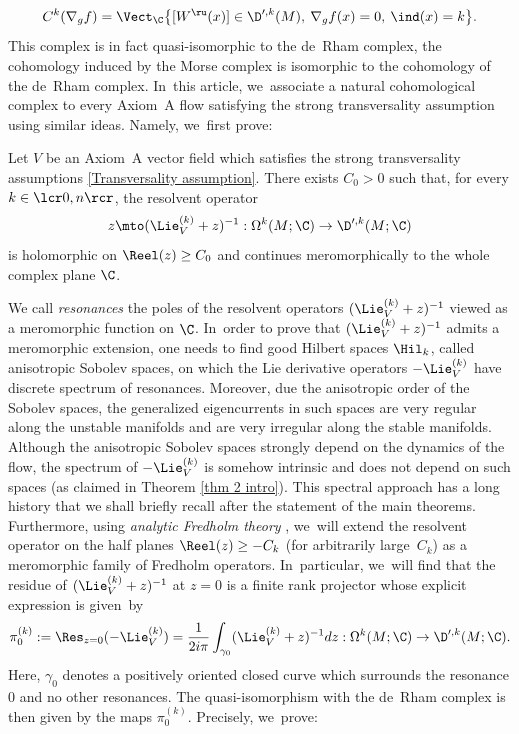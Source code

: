 \begin{equation}{\label{eq: intro Morse complex current Laudenbach}}
C^k (\nabla_g f) = \Vect_{\C} \bigl\{ [W^\ru (x)] \in \D'^{,k} (M), \: \nabla_g f(x) = 0,\: \ind (x) = k \bigr\}.
\end{equation}
This complex is in fact quasi-isomorphic to the de~Rham complex, \ie the cohomology induced by the Morse complex is isomorphic to the cohomology of the de~Rham complex. In~this article, we~associate a natural cohomological complex to every Axiom~A flow satisfying the strong transversality assumption using similar ideas. Namely, we~first prove:

\begin{thm}\label{thm 2 intro}
Let $V$ be an Axiom~A vector field which satisfies the strong transversality assumptions \eqref{Transversality assumption}. There exists $C_0 > 0$ such that, for every $k\in\lcr0,n\rcr$, the resolvent operator
\[
z \mto(\Lie_V^{(k)} + z)^{-1}: \Omega^k (M;\C) \to \D'^{, k}(M;\C)
\]
is holomorphic on $\Reel (z)\geq C_0$ and continues meromorphically to the whole complex plane $\C$.
\end{thm}

We call \textit{resonances} the poles of the resolvent operators $(\Lie_V^{(k)} + z)^{-1}$ viewed as a meromorphic function on $\C$. In~order to prove that $(\Lie_V^{(k)} + z)^{-1}$ admits a meromorphic extension, one needs to find good Hilbert spaces $\Hil_k$, called anisotropic Sobolev spaces, on which the Lie derivative operators $-\Lie_V^{(k)}$ have discrete spectrum of resonances. Moreover, due the anisotropic order of the Sobolev spaces, the generalized eigencurrents in such spaces are very regular along the unstable manifolds and are very irregular along the stable manifolds. Although the anisotropic Sobolev spaces strongly depend on the dynamics of the flow, the spectrum of $-\Lie_V^{(k)}$ is somehow intrinsic and does not depend on such spaces (as claimed in Theorem \ref{thm 2 intro}). This spectral approach has a long history that we shall briefly recall after the statement of the main theorems. Furthermore, using \textit{analytic Fredholm theory} \cite[App.\,C]{DZ-book}, we~will extend the resolvent operator on the half planes $\Reel (z)\geq -C_k$ (for arbitrarily large~$C_k$) as a meromorphic family of Fredholm operators. In~particular, we~will find that the residue of $(\Lie_V^{(k)} + z)^{-1}$ at $z = 0$ is a finite rank projector whose explicit expression is given~by
\[
\pi_0^{(k)}:= \Res_{z = 0} (- \Lie_V^{(k)}) = \frac{1}{2 i \pi} \int_{\gamma_0} (\Lie_V^{(k)} + z)^{-1} dz: \Omega^k (M;\C) \to \D'^{,k}(M;\C).
\]
Here, $\gamma_0$ denotes a positively oriented closed curve which surrounds the resonance $0$ and no other resonances. The quasi-isomorphism with the de~Rham complex is then given by the maps $\pi_0^{(k)}$. Precisely, we~prove:

